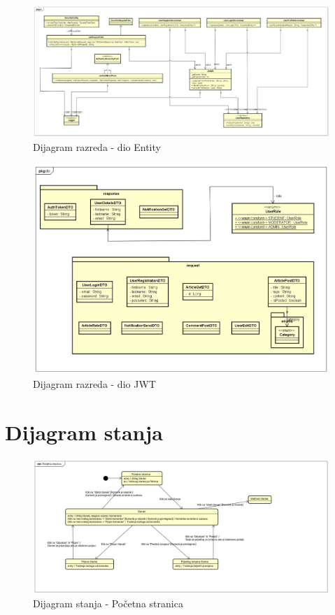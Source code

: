 \begin{figure}[H]
	\includegraphics[scale=0.4]{slike/DijagramRazreda5.jpg}
	\centering
	\caption{Dijagram razreda - dio Entity}
	\label{fig:class_diagram_entity}
\end{figure}

\eject

\begin{figure}[H]
	\includegraphics[scale=0.4]{slike/DijagramRazreda6.jpg}
	\centering
	\caption{Dijagram razreda - dio JWT}
	\label{fig:class_diagram_jwt}
\end{figure}

\eject


\section{Dijagram stanja}

\begin{figure}[H]
	\includegraphics[scale=0.4]{slike/dijagrami-stanja/pocetna-stranica.png}
	\centering
	\caption{Dijagram stanja - Početna stranica}
	\label{fig:state_diagram_home}
\end{figure}

